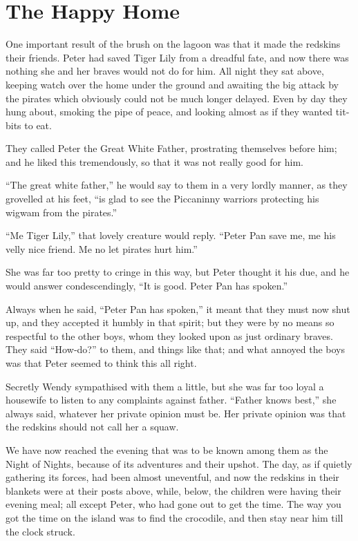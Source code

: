 
\chapter{The Happy Home}

One important result of the brush on the lagoon was that it made the redskins their friends.
Peter had saved Tiger Lily from a dreadful fate,
and now there was nothing she and her braves would not do for him.
All night they sat above,
keeping watch over the home under the ground and awaiting the big attack by the pirates
which obviously could not be much longer delayed.
Even by day they hung about, smoking the pipe of peace, and looking almost as if they wanted tit‐bits to eat.

They called Peter the Great White Father, prostrating themselves before him;
and he liked this tremendously, so that it was not really good for him.

“The great white father,” he would say to them in a very lordly manner, as they grovelled at his feet,
“is glad to see the Piccaninny warriors protecting his wigwam from the pirates.”

“Me Tiger Lily,” that lovely creature would reply.
“Peter Pan save me, me his velly nice friend.
Me no let pirates hurt him.”

She was far too pretty to cringe in this way, but Peter thought it his due,
and he would answer condescendingly, “It is good.
Peter Pan has spoken.”

Always when he said, “Peter Pan has spoken,” it meant that they must now shut up,
and they accepted it humbly in that spirit;
but they were by no means so respectful to the other boys,
whom they looked upon as just ordinary braves.
They said “How‐do?\@” to them, and things like that;
and what annoyed the boys was that Peter seemed to think this all right.

Secretly Wendy sympathised with them a little,
but she was far too loyal a housewife to listen to any complaints against father.
“Father knows best,” she always said, whatever her private opinion must be.
Her private opinion was that the redskins should not call her a squaw.

We have now reached the evening that was to be known among them as the Night of Nights,
because of its adventures and their upshot.
The day, as if quietly gathering its forces, had been almost uneventful,
and now the redskins in their blankets were at their posts above,
while, below, the children were having their evening meal;
all except Peter, who had gone out to get the time.
The way you got the time on the island was to find the crocodile,
and then stay near him till the clock struck.


